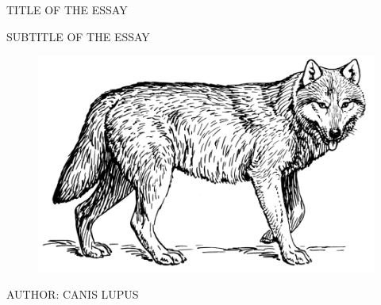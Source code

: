 \begin{titlepage}

  \begin{center}


    {
      \fontsize{60pt}{70pt}\selectfont
      \textcolor{titlecolor}
      {TITLE OF THE ESSAY}\\[2cm]
    }

    \textsc{\huge
      SUBTITLE OF THE ESSAY
    }\\[4cm]

    \begin{figure}[h]
      \centering
      \includegraphics[width=12cm]{logo.png}
    \end{figure}

    \vspace{2cm}

    \textsc{\Large
      AUTHOR: CANIS LUPUS
    }

  \end{center}
\end{titlepage}
